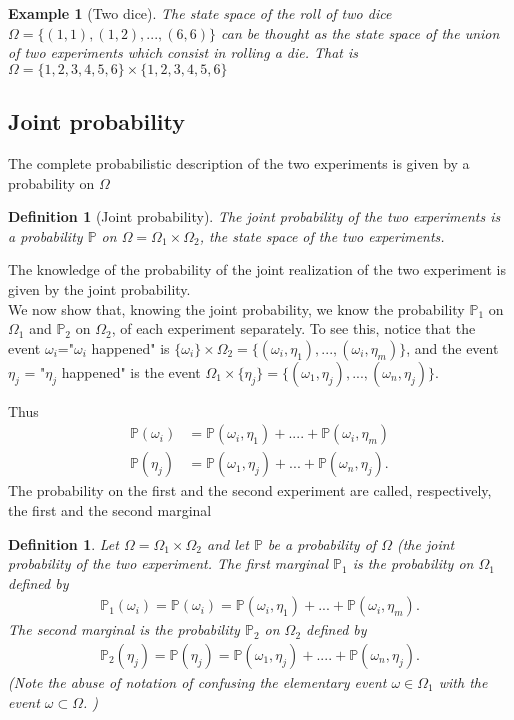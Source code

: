 \documentclass[12pt]{article}
\newtheorem{definition}[theorem]{Definition}
\newtheorem{example}[theorem]{Example}
\newcommand{\<}{{\langle \!\! \langle}}
\renewcommand{\>}{{\rangle \!\! \rangle}}
\newcommand{\bel}[2]{\begin{equation} \label{#1} \begin{split} #2
 					\end{split} \end{equation}}
\begin{document}
\begin{example}[Two dice] The state space of the roll of two dice $\Omega=\{(1,1),(1,2),...,(6,6)\}$ can be thought as the state space of the union of two experiments which consist in rolling a die. That is $\Omega=\{1,2,3,4,5,6\}\times \{1,2,3,4,5,6\}$\\
\end{example}


\subsection{Joint probability}

The complete probabilistic description of the two experiments is given by a probability on $\Omega$
\begin{definition}[Joint probability]
The joint probability of the two experiments is a probability $\mathbb{P}$ on $\Omega=\Omega_1\times \Omega_2$, the state space of the two experiments.
\end{definition}

The knowledge of the probability of the joint realization of the two experiment is given by the joint probability. \\

We now show that, knowing the joint probability, we know the probability $\mathbb{P}_1$ on $\Omega_1$ and $\mathbb{P}_2$ on $\Omega_2$, of each experiment separately.
To see this, notice that the event $\omega_i$="$\omega_i$ happened" is $\{\omega_i\}\times\Omega_2=\{(\omega_i,\eta_1),...,(\omega_i,\eta_m)\}$, and the event $\eta_j$ = "$\eta_j$ happened" is the event $\Omega_1\times\{\eta_j\}=\{(\omega_1,\eta_j),...,(\omega_n,\eta_j)\}$.  

Thus 
\bel{}{\mathbb{P}(\omega_i) &= \mathbb{P}(\omega_i,\eta_1)+....+\mathbb{P}(\omega_i,\eta_m) \\
\mathbb{P}(\eta_j) &= \mathbb{P}(\omega_1,\eta_j)+...+\mathbb{P}(\omega_n,\eta_j).}
The probability on the first and the second experiment are called, respectively, the first and the second marginal

\begin{definition}
Let $\Omega= \Omega_1\times \Omega_2$ and let $\mathbb{P}$ be a probability of $\Omega$ (the joint probability of the two experiment.
The first marginal $\mathbb{P}_1$ is the probability on $\Omega_1$ defined by
\bel{d:marg1}{\mathbb{P}_1(\omega_i) = \mathbb{P}(\omega_i)=\mathbb{P}(\omega_i,\eta_1)+...+\mathbb{P}(\omega_i,\eta_m).}
The second marginal is the probability $\mathbb{P}_2$ on $\Omega_2$ defined by 
	\bel{d:marg2}{\mathbb{P}_2(\eta_j) = \mathbb{P}(\eta_j) = \mathbb{P}(\omega_1,\eta_j)+....+ \mathbb{P}(\omega_n, \eta_j).}
	(Note the abuse of notation of confusing the elementary event $\omega\in\Omega_1$ with the event $\omega \subset  \Omega$. )
\end{definition}
\end{document}
